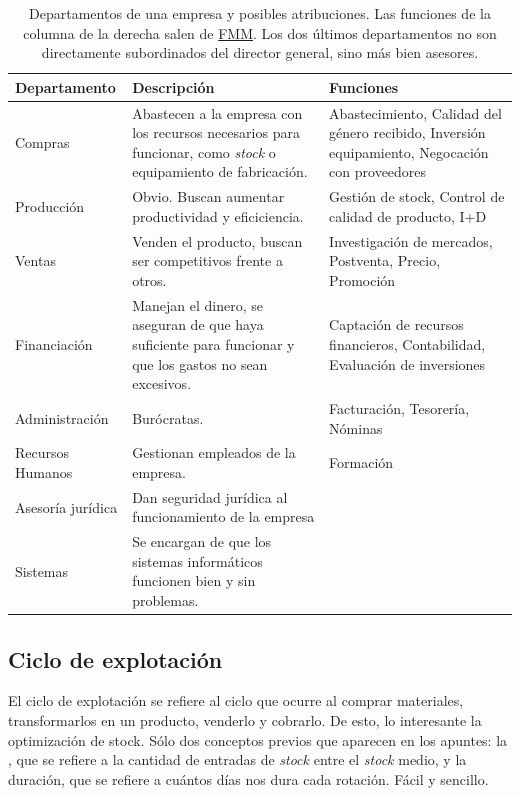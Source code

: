 \documentclass[nochap,palatino,notitlepage]{apuntes}
\begin{document}
\begin{table}[hbtp]
\centering
\begin{tabular}{l|p{5cm}|p{5cm}}
\textbf{Departamento} & \textbf{Descripción} & \textbf{Funciones} \\ \toprule
Compras & Abastecen a la empresa con los recursos necesarios para funcionar, como \textit{stock} o equipamiento de fabricación. & Abastecimiento, Calidad del género recibido, Inversión equipamiento, Negocación con proveedores \\ \midrule

Producción & Obvio. Buscan aumentar productividad y eficiciencia. & Gestión de stock, Control de calidad de producto, I+D \\ \midrule

Ventas & Venden el producto, buscan ser competitivos frente a otros. & Investigación de mercados, Postventa, Precio, Promoción \\ \midrule

Financiación & Manejan el dinero, se aseguran de que haya suficiente para funcionar y que los gastos no sean excesivos. & Captación de recursos financieros, Contabilidad, Evaluación de inversiones \\ \midrule

Administración & Burócratas. & Facturación, Tesorería, Nóminas \\ \midrule

Recursos Humanos & Gestionan empleados de la empresa. & Formación\\ \midrule \midrule
Asesoría jurídica & Dan seguridad jurídica al funcionamiento de la empresa & \\ \midrule
Sistemas & Se encargan de que los sistemas informáticos funcionen bien y sin problemas. & \\
\end{tabular}
\caption{Departamentos de una empresa y posibles atribuciones. Las funciones de la columna de la derecha salen de \href{http://maestremiranda.com/techdir/wp-content/uploads/2015/10/Organizacion2.pdf}{FMM}. Los dos últimos departamentos no son directamente subordinados del director general, sino más bien asesores.}
\label{tab:Organizacion}
\end{table}

\subsection{Ciclo de explotación}

El ciclo de explotación se refiere al ciclo que ocurre al comprar materiales, transformarlos en un producto, venderlo y cobrarlo. De esto, lo interesante la optimización de stock. Sólo dos conceptos previos que aparecen en los apuntes: la , que se refiere a la cantidad de entradas de \textit{stock} entre el \textit{stock} medio, y la duración, que se refiere a cuántos días nos dura cada rotación. Fácil y sencillo.
\end{document}
